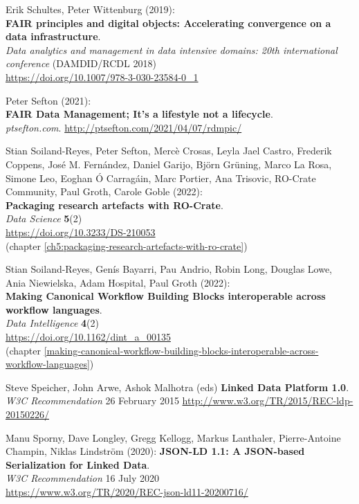 \begin{thebibliography}{9}
Erik Schultes, Peter Wittenburg (2019):\\
\textbf{FAIR principles and digital objects: Accelerating convergence on
a data infrastructure}.\\
\emph{Data analytics and management in data intensive domains: 20th
international conference} (DAMDID/RCDL 2018)\\
\url{https://doi.org/10.1007/978-3-030-23584-0_1}

Peter Sefton (2021):\\
\textbf{FAIR Data Management; It's a lifestyle not a lifecycle}.\\
\emph{ptsefton.com}. \url{http://ptsefton.com/2021/04/07/rdmpic/}

Stian Soiland-Reyes, Peter Sefton, Mercè
Crosas, Leyla Jael Castro, Frederik Coppens, José M. Fernández, Daniel
Garijo, Björn Grüning, Marco La Rosa, Simone Leo, Eoghan Ó Carragáin,
Marc Portier, Ana Trisovic, RO-Crate Community, Paul Groth, Carole Goble
(2022):\\
\textbf{Packaging research artefacts with RO-Crate}.\\
\emph{Data Science} \textbf{5}(2)\\
\url{https://doi.org/10.3233/DS-210053}\\
(chapter \vref{ch5:packaging-research-artefacts-with-ro-crate})

Stian Soiland-Reyes, Genís Bayarri, Pau
Andrio, Robin Long, Douglas Lowe, Ania Niewielska, Adam Hospital, Paul
Groth (2022):\\
\textbf{Making Canonical
Workflow Building Blocks interoperable across workflow languages}.\\
\emph{Data Intelligence} \textbf{4}(2)\\
\url{https://doi.org/10.1162/dint_a_00135}\\
(chapter \vref{making-canonical-workflow-building-blocks-interoperable-across-workflow-languages})

Steve Speicher, John Arwe,  Ashok Malhotra (eds)
\textbf{Linked Data Platform 1.0}. 
\emph{W3C Recommendation} 26 February 2015
\url{http://www.w3.org/TR/2015/REC-ldp-20150226/}

Manu Sporny, Dave Longley,  Gregg Kellogg,  Markus Lanthaler,  Pierre-Antoine Champin, Niklas Lindström (2020):
\textbf{JSON-LD 1.1: A JSON-based Serialization for Linked Data}.\\
\emph{W3C Recommendation} 16 July 2020\\
\url{https://www.w3.org/TR/2020/REC-json-ld11-20200716/}


\end{thebibliography}
